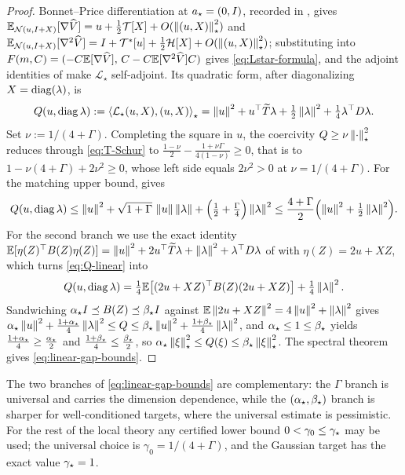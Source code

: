 \begin{proof}
Bonnet--Price differentiation at $a_\star=(0,I)$, recorded in , gives
$\mathbb{E}_{\mathcal{N}(u,I+X)}[\nabla\widehat V]=u+\tfrac12\mathcal T[X]+O(\left\lVert (u,X)\right\rVert_\star^2)$ and
$\mathbb{E}_{\mathcal{N}(u,I+X)}[\nabla^2\widehat V]=I+\mathcal T^*[u]+\tfrac12\mathcal H[X]+O(\left\lVert (u,X)\right\rVert_\star^2)$;
substituting into $F(m,C)=(-C\mathbb{E}[\nabla\widehat V],\,C-C\mathbb{E}[\nabla^2\widehat V]C)$ gives
\eqref{eq:Lstar-formula}, and the adjoint identities of  make
$\mathcal L_\star$ self-adjoint. Its quadratic form, after diagonalizing $X=\operatorname{diag}(\lambda)$, is
\begin{equation}
\label{eq:Q-linear}
    Q(u,\operatorname{diag}\lambda)
    :=\left\langle \mathcal L_\star(u,X),(u,X)\right\rangle_\star
    =\left\lVert u\right\rVert^2+u^\top\widetilde T\lambda+\tfrac12\left\lVert \lambda\right\rVert^2+\tfrac14\lambda^\top D\lambda .
\end{equation}
Set $\nu:=1/(4+\Gamma)$. Completing the square in $u$, the coercivity
$Q\geq\nu\left\lVert \cdot\right\rVert_\star^2$ reduces through \eqref{eq:T-Schur} to
$\tfrac{1-\nu}2-\tfrac{1+\nu\Gamma}{4(1-\nu)}\geq0$, that is to
$1-\nu(4+\Gamma)+2\nu^2\geq0$, whose left side equals $2\nu^2>0$ at $\nu=1/(4+\Gamma)$. For the
matching upper bound,  gives
\[
    Q(u,\operatorname{diag}\lambda)
    \leq\left\lVert u\right\rVert^2+\sqrt{1+\Gamma}\,\left\lVert u\right\rVert\left\lVert \lambda\right\rVert+\Bigl(\tfrac12+\tfrac\Gamma4\Bigr)\left\lVert \lambda\right\rVert^2
    \leq\frac{4+\Gamma}2\Bigl(\left\lVert u\right\rVert^2+\tfrac12\left\lVert \lambda\right\rVert^2\Bigr).
\]
For the second branch we use the exact identity
$\mathbb{E}[\eta(Z)^\top B(Z)\eta(Z)]=\left\lVert u\right\rVert^2+2u^\top\widetilde T\lambda+\left\lVert \lambda\right\rVert^2+\lambda^\top D\lambda$
of  with $\eta(Z)=2u+XZ$, which turns \eqref{eq:Q-linear} into
\[
    Q(u,\operatorname{diag}\lambda)=\tfrac14\mathbb{E}\bigl[(2u+XZ)^\top B(Z)(2u+XZ)\bigr]+\tfrac14\left\lVert \lambda\right\rVert^2 .
\]
Sandwiching $\alpha_\star I\preceq B(Z)\preceq\beta_\star I$ against
$\mathbb{E}\left\lVert 2u+XZ\right\rVert^2=4\left\lVert u\right\rVert^2+\left\lVert \lambda\right\rVert^2$ gives
$\alpha_\star\left\lVert u\right\rVert^2+\tfrac{1+\alpha_\star}4\left\lVert \lambda\right\rVert^2\leq Q\leq\beta_\star\left\lVert u\right\rVert^2+\tfrac{1+\beta_\star}4\left\lVert \lambda\right\rVert^2$,
and $\alpha_\star\leq1\leq\beta_\star$ yields $\tfrac{1+\alpha_\star}4\geq\tfrac{\alpha_\star}2$ and
$\tfrac{1+\beta_\star}4\leq\tfrac{\beta_\star}2$, so
$\alpha_\star\left\lVert \xi\right\rVert_\star^2\leq Q(\xi)\leq\beta_\star\left\lVert \xi\right\rVert_\star^2$. The spectral theorem gives
\eqref{eq:linear-gap-bounds}.
\end{proof}

The two branches of \eqref{eq:linear-gap-bounds} are complementary: the $\Gamma$ branch is
universal and carries the dimension dependence, while the $(\alpha_\star,\beta_\star)$ branch is
sharper for well-conditioned targets, where the universal estimate is pessimistic. For the rest
of the local theory any certified lower bound $0<\gamma_0\leq\gamma_\star$ may be used; the universal
choice is $\gamma_0=1/(4+\Gamma)$, and the Gaussian target has the exact value $\gamma_\star=1$.


